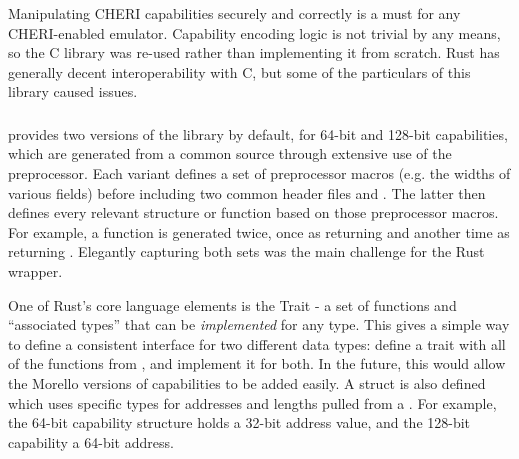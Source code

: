Manipulating CHERI capabilities securely and correctly is a must for any CHERI-enabled emulator.
Capability encoding logic is not trivial by any means, so the  C library was re-used rather than implementing it from scratch.
Rust has generally decent interoperability with C, but some of the particulars of this library caused issues.

\subsubsection{}
 provides two versions of the library by default, for 64-bit and 128-bit capabilities, which are generated from a common source through extensive use of the preprocessor.
Each variant defines a set of preprocessor macros (e.g. the widths of various fields) before including two common header files  and .
The latter then defines every relevant structure or function based on those preprocessor macros.
For example, a function  is generated twice, once as   returning  and another time as  returning .
Elegantly capturing both sets was the main challenge for the Rust wrapper.


One of Rust's core language elements is the Trait - a set of functions and \enquote{associated types} that can be \emph{implemented} for any type.
This gives a simple way to define a consistent interface for two different data types: define a trait  with all of the functions from , and implement it for both.
In the future, this would allow the Morello versions of capabilities to be added easily.
A struct  is also defined which uses specific types for addresses and lengths pulled from a .
For example, the 64-bit capability structure holds a 32-bit address value, and the 128-bit capability a 64-bit address.

